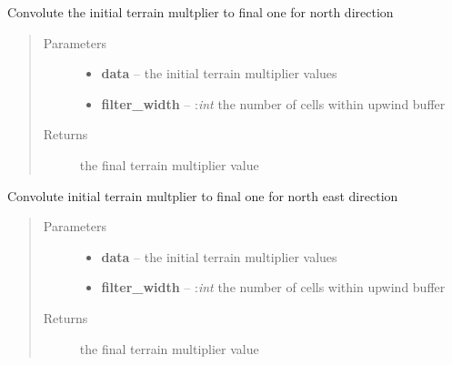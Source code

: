 \documentclass[letterpaper,10pt,english]{sphinxmanual}
\begin{document}

\begin{fulllineitems}
\label{docs/terrain:terrain_mult.convo_n}
Convolute the initial terrain multplier to final one for north direction
\begin{quote}\begin{description}
\item[{Parameters}] \leavevmode\begin{itemize}
\item {} 
\textbf{data} --  the initial terrain multiplier values

\item {} 
\textbf{filter\_width} -- :\emph{int} the number of cells within upwind buffer

\end{itemize}

\item[{Returns}] \leavevmode
{} the final terrain multiplier value

\end{description}\end{quote}

\end{fulllineitems}



\begin{fulllineitems}
\label{docs/terrain:terrain_mult.convo_ne}
Convolute initial terrain multplier to final one for north east direction
\begin{quote}\begin{description}
\item[{Parameters}] \leavevmode\begin{itemize}
\item {} 
\textbf{data} --  the initial terrain multiplier values

\item {} 
\textbf{filter\_width} -- :\emph{int} the number of cells within upwind buffer

\end{itemize}

\item[{Returns}] \leavevmode
{} the final terrain multiplier value

\end{description}\end{quote}

\end{fulllineitems}
\end{document}
